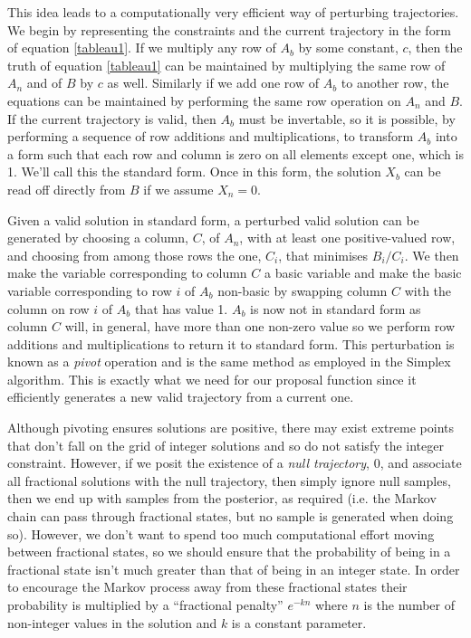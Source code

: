 \documentclass{article}
\begin{document}
This idea leads to a computationally very efficient way of perturbing trajectories. We begin by representing the constraints and the current trajectory in the form of equation \ref{tableau1}. If we multiply any row of $A_b$ by some constant, $c$, then the truth of equation \ref{tableau1} can be maintained by multiplying the same row of $A_n$ and of $B$ by $c$ as well. Similarly if we add one row of $A_b$ to another row, the equations can be maintained by performing the same row operation on $A_n$ and $B$. If the current trajectory is valid, then $A_b$ must be invertable, so it is possible, by performing a sequence of row additions and multiplications, to transform $A_b$ into a form such that each row and column is zero on all elements except one, which is 1. We'll call this the standard form. Once in this form, the solution $X_b$ can be read off directly from $B$ if we assume $X_n = 0$.

Given a valid solution in standard form, a perturbed valid solution can be generated by choosing a column, $C$, of $A_n$, with at least one positive-valued row, and choosing from among those rows the one, $C_i$, that minimises $B_i/C_i$. We then make the variable corresponding to column $C$ a basic variable and make the basic variable corresponding to row $i$ of $A_b$ non-basic by swapping column $C$ with the column on row $i$ of $A_b$ that has value 1. $A_b$ is now not in standard form as column $C$ will, in general, have more than one non-zero value so we perform row additions and multiplications to return it to standard form. This perturbation is known as a \textit{pivot} operation and is the same method as employed in the Simplex algorithm\cite{dantzig1955generalized}\cite{vanderbei2015linear}. This is exactly what we need for our proposal function since it efficiently generates a new valid trajectory from a current one.

Although pivoting ensures solutions are positive, there may exist extreme points that don't fall on the grid of integer solutions and so do not satisfy the integer constraint. However, if we posit the existence of a \textit{null trajectory}, $0$, and associate all fractional solutions with the null trajectory, then simply ignore null samples, then we end up with samples from the posterior, as required (i.e. the Markov chain can pass through fractional states, but no sample is generated when doing so). However, we don't want to spend too much computational effort moving between fractional states, so we should ensure that the probability of being in a fractional state isn't much greater than that of being in an integer state. In order to encourage the Markov process away from these fractional states their probability is multiplied by a ``fractional penalty'' $e^{-kn}$ where $n$ is the number of non-integer values in the solution and $k$ is a constant parameter.
\end{document}
